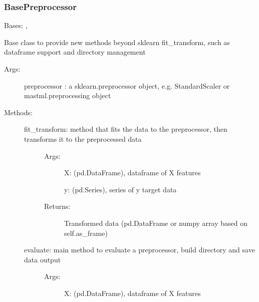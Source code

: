 \documentclass[letterpaper,10pt,english]{sphinxmanual}
\begin{document}
\subsubsection{BasePreprocessor}
\label{\detokenize{api/mastml.preprocessing.BasePreprocessor:basepreprocessor}}\label{\detokenize{api/mastml.preprocessing.BasePreprocessor::doc}}

\begin{fulllineitems}
\label{\detokenize{api/mastml.preprocessing.BasePreprocessor:mastml.preprocessing.BasePreprocessor}}
Bases: , 

Base class to provide new methods beyond sklearn fit\_transform, such as dataframe support and directory management
\begin{description}
\item[{Args:}] \leavevmode
preprocessor : a sklearn.preprocessor object, e.g. StandardScaler or mastml.preprocessing object

\item[{Methods:}] \leavevmode\begin{description}
\item[{fit\_transform: method that fits the data to the preprocessor, then transforms it to the preprocessed data}] \leavevmode\begin{description}
\item[{Args:}] \leavevmode
X: (pd.DataFrame), dataframe of X features

y: (pd.Series), series of y target data

\item[{Returns:}] \leavevmode
Transformed data (pd.DataFrame or numpy array based on self.as\_frame)

\end{description}

\item[{evaluate: main method to evaluate a preprocessor, build directory and save data output}] \leavevmode\begin{description}
\item[{Args:}] \leavevmode
X: (pd.DataFrame), dataframe of X features


\end{description}
\end{description}
\end{description}
\end{fulllineitems}
\end{document}
